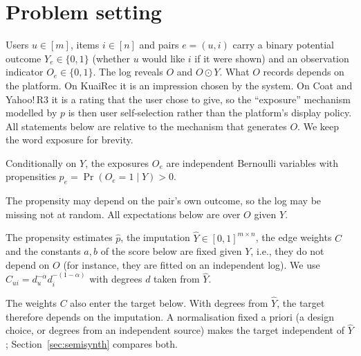 \section{Problem setting}

Users $u\in[m]$, items $i\in[n]$ and pairs $e=(u,i)$ carry a binary potential
outcome $Y_e\in\{0,1\}$ (whether $u$ would like $i$ if it were shown) and an
observation indicator $O_e\in\{0,1\}$. The log reveals $O$ and $O\odot Y$. What
$O$ records depends on the platform. On KuaiRec it is an impression chosen by
the system. On Coat and Yahoo!\,R3 it is a rating that the user chose to give,
so the ``exposure'' mechanism modelled by $p$ is then user self-selection
rather than the platform's display policy. All statements below are relative
to the mechanism that generates $O$. We keep the word exposure for brevity.

\begin{assumption}\label{as:unconf}
Conditionally on $Y$, the exposures $O_e$ are independent Bernoulli variables
with propensities $p_e=\Pr(O_e=1\mid Y)>0$.
\end{assumption}
The propensity may depend on the pair's own outcome, so the log may be missing
not at random. All expectations below are over $O$ given $Y$.

\begin{assumption}\label{as:fixed}
The propensity estimates $\hat p$, the imputation $\hat Y\in[0,1]^{m\times n}$,
the edge weights $C$ and the constants $a,b$ of the score below are fixed
given $Y$, i.e., they do not depend on $O$ (for instance, they are fitted on
an independent log). We use $C_{ui}=d_u^{-\alpha}d_i^{-(1-\alpha)}$ with degrees
$d$ taken from $\hat Y$.
\end{assumption}
The weights $C$ also enter the target below. With degrees from $\hat Y$, the
target therefore depends on the imputation. A normalisation fixed a priori (a
design choice, or degrees from an independent source) makes the target
independent of $\hat Y$; Section~\ref{sec:semisynth} compares both.

